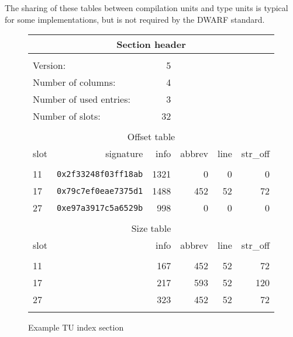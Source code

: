 The sharing of these tables between compilation units and type units
is typical for some implementations, but is not required by the
DWARF standard.

\begin{figure}[ht]
\begin{center}
\begin{tabular}{lrrrrr}
\\
  \multicolumn{6}{c}{Section header} \\
\hline \\
  \multicolumn{2}{l}{Version:}&                 5 \\
  \multicolumn{2}{l}{Number of columns:}&       4 \\
  \multicolumn{2}{l}{Number of used entries:}&  3 \\
  \multicolumn{2}{l}{Number of slots:}&         32 \\
\\
  \multicolumn{6}{c}{Offset table} \\
  \hline
  slot&  signature&                    info&   abbrev&     line& str\_off \\ \\
  11& \texttt{0x2f33248f03ff18ab}&     1321&        0&        0&        0 \\
  17& \texttt{0x79c7ef0eae7375d1}&     1488&      452&       52&       72 \\
  27& \texttt{0xe97a3917c5a6529b}&      998&        0&        0&        0 \\
\\
  \multicolumn{6}{c}{Size table} \\
  \hline
  slot&                          &     info&   abbrev&     line& str\_off \\ \\
  11&                            &      167&      452&       52&       72 \\
  17&                            &      217&      593&       52&      120 \\
  27&                            &      323&      452&       52&       72 \\
\\
\hline
\end{tabular}
\end{center}
\caption{Example TU index section}
\label{fig:exampletuindexsection}
\end{figure}

